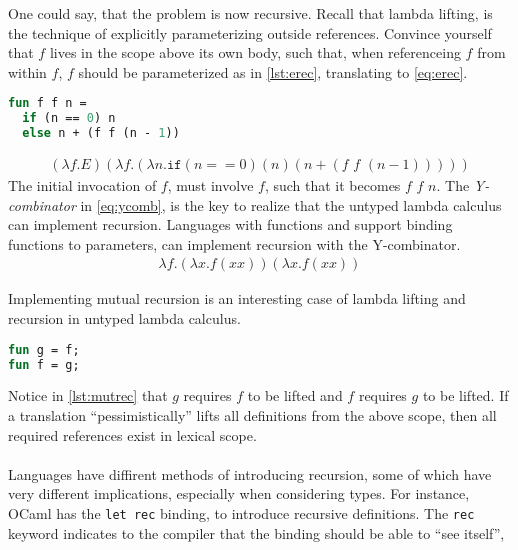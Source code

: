 \documentclass[11pt,oneside,a4paper]{report}
\begin{document}
One could say, that the problem is now recursive.
Recall that lambda lifting, is the technique of explicitly parameterizing outside references.
Convince yourself that $f$ lives in the scope above its own body, such that, when referenceing $f$ from within $f$, $f$ should be parameterized as in \autoref{lst:erec}, translating to \autoref{eq:erec}.
\begin{lstlisting}[language=ML,caption={Explicitly passing recursive function},label={lst:erec},xleftmargin=.32\textwidth]
fun f f n = 
  if (n == 0) n
  else n + (f f (n - 1))
\end{lstlisting}
\begin{align}
    (\lambda f . E) (\lambda f . (\lambda n . \texttt{if} (n == 0) (n) (n + (f \,\, f \,\, (n - 1)))))
    \label{eq:erec}
\end{align}
The initial invocation of $f$, must involve $f$, such that it becomes $f \,\, f \,\, n$.
The \textit{Y-combinator} in \autoref{eq:ycomb}, is the key to realize that the untyped lambda calculus can implement recursion.
Languages with functions and support binding functions to parameters, can implement recursion with the Y-combinator.
\begin{align}
    \lambda f . (\lambda x . f (x x)) (\lambda x . f (x x))
    \label{eq:ycomb}
\end{align}

Implementing mutual recursion is an interesting case of lambda lifting and recursion in untyped lambda calculus.
\begin{lstlisting}[language=ML,caption={Mutual recursion},label={lst:mutrec},xleftmargin=.32\textwidth]
fun g = f;
fun f = g;
\end{lstlisting}
Notice in \autoref{lst:mutrec} that $g$ requires $f$ to be lifted and $f$ requires $g$ to be lifted.
If a translation ``pessimistically'' lifts all definitions from the above scope, then all required references exist in lexical scope.
\\\\
Languages have diffirent methods of introducing recursion, some of which have very different implications, especially when considering types.
For instance, OCaml has the \texttt{let rec} binding, to introduce recursive definitions.
The \texttt{rec} keyword indicates to the compiler that the binding should be able to ``see itself'',
\end{document}

